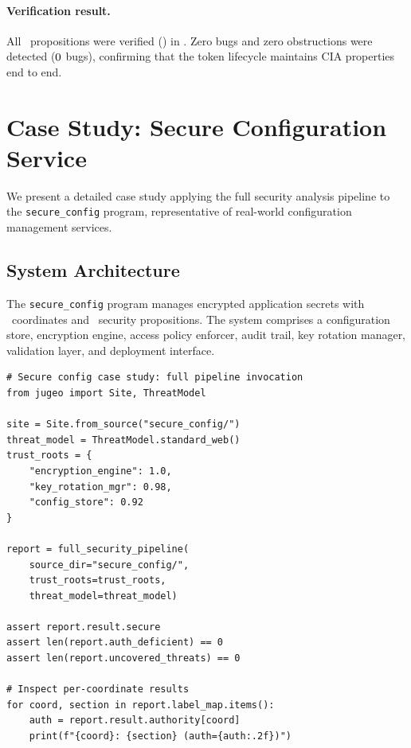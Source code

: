 \documentclass[11pt]{article}
\begin{document}
\paragraph{Verification result.}
All \ppLXIXsectokenmanagerProps\ propositions were verified
(\ppLXIXsectokenmanagerVerdict) in \ppLXIXsectokenmanagerTime.
Zero bugs and zero obstructions were detected
($0$ bugs), confirming that the token
lifecycle maintains CIA properties end to end.

\section{Case Study: Secure Configuration Service}\label{sec:casestudy}

We present a detailed case study applying the full security analysis
pipeline to the \texttt{secure\_config} program, representative of
real-world configuration management services.

\subsection{System Architecture}

The \texttt{secure\_config} program manages encrypted application
secrets with \ppLXIXsecsecureconfigCoords\ coordinates and
\ppLXIXsecsecureconfigProps\ security propositions.  The system
comprises a configuration store, encryption engine, access policy
enforcer, audit trail, key rotation manager, validation layer, and
deployment interface.

\begin{lstlisting}[style=jugeo-python]
# Secure config case study: full pipeline invocation
from jugeo import Site, ThreatModel

site = Site.from_source("secure_config/")
threat_model = ThreatModel.standard_web()
trust_roots = {
    "encryption_engine": 1.0,
    "key_rotation_mgr": 0.98,
    "config_store": 0.92
}

report = full_security_pipeline(
    source_dir="secure_config/",
    trust_roots=trust_roots,
    threat_model=threat_model)

assert report.result.secure
assert len(report.auth_deficient) == 0
assert len(report.uncovered_threats) == 0

# Inspect per-coordinate results
for coord, section in report.label_map.items():
    auth = report.result.authority[coord]
    print(f"{coord}: {section} (auth={auth:.2f})")
\end{lstlisting}
\end{document}
